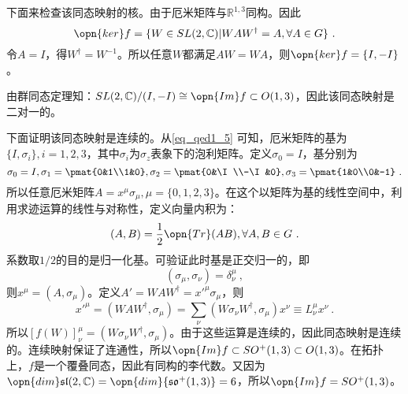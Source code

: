 下面来检查该同态映射的核。由于厄米矩阵与$\mathbb R^{1,3}$同构。因此
\begin{equation}
\opn{ker} f=\{W\in SL(2,\mathbb C)|WAW^{\dagger}=A,\forall A\in G \}~.
\end{equation}
令$A=I$，得$W^{\dagger}=W^{-1}$。所以任意$W$都满足$AW=WA$，则$\opn{ker} f=\{I,-I\}$。

由群同态定理知：$SL(2,\mathbb C)/(I,-I)\cong \opn{Im}f\subset O(1,3)$，因此该同态映射是二对一的。

下面证明该同态映射是连续的。从\autoref{eq_qed1_5} 可知，厄米矩阵的基为$\{I,\sigma_i\},i=1,2,3$，其中$\sigma_i$为$\sigma_z$表象下的泡利矩阵。定义$\sigma_0=I$，基分别为
\begin{equation}
\sigma_0=I,\sigma_1=\pmat{0&1\\1&0},\sigma_2=\pmat{0&\I\\-\I&0},\sigma_3=\pmat{1&0\\0&-1}~.
\end{equation}
所以任意厄米矩阵$A=x^{\mu}\sigma_{\mu},\mu=\{0,1,2,3\}$。在这个以矩阵为基的线性空间中，利用求迹运算的线性与对称性，定义向量内积为：
\begin{equation}
(A,B)=\frac{1}{2}\opn{Tr}(AB),\forall A,B\in G~.
\end{equation}
系数取$1/2$的目的是归一化基。可验证此时基是正交归一的，即
\begin{equation}
(\sigma_{\mu},\sigma_{\nu})=\delta^{\mu}_{\nu}~,
\end{equation}
则$x^{\mu}=(A,\sigma_{\mu})$。定义$A'=WAW^{\dagger}=x'^{\mu}\sigma_{\mu}$，则
\begin{equation}
x'^{\mu}=(WAW^{\dagger},\sigma
_{\mu})=\sum_{\nu}(W\sigma_{\nu}W^{\dagger},\sigma_{\mu})x^{\nu}\equiv L^{\mu}_{\nu}x^{\nu}~.
\end{equation}
所以$[f(W)]^{\mu}_{\nu}=(W\sigma_{\nu}W^{\dagger},\sigma_{\mu})$。由于这些运算是连续的，因此同态映射是连续的。连续映射保证了连通性，所以$\opn{Im}f\subset SO^+(1,3)\subset O(1,3)$。在拓扑上，$f$是一个覆叠同态，因此有同构的李代数。又因为$\opn{dim}\mathfrak {sl}(2,\mathbb C)=\opn{dim}{\mathfrak{so^+}(1,3)}=6$，所以$\opn{Im}f=SO^+(1,3)$。




